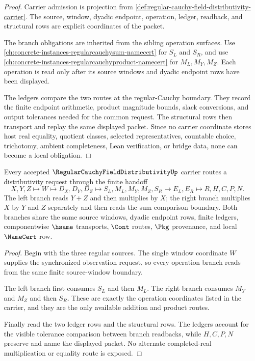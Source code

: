 \begin{proof}
Carrier admission is projection from \autoref{def:regular-cauchy-field-distributivity-carrier}. The source, window, dyadic endpoint, operation, ledger, readback, and structural rows are explicit coordinates of the packet.

The branch obligations are inherited from the sibling operation surfaces. Use \autoref{ch:concrete-instances-regularcauchysum-namecert} for $S_L$ and $S_R$, and use \autoref{ch:concrete-instances-regularcauchyproduct-namecert} for $M_L,M_Y,M_Z$. Each operation is read only after its source windows and dyadic endpoint rows have been displayed.

The ledgers compare the two routes at the regular-Cauchy boundary. They record the finite endpoint arithmetic, product magnitude bounds, slack conversions, and output tolerances needed for the common request. The structural rows then transport and replay the same displayed packet. Since no carrier coordinate stores host real equality, quotient classes, selected representatives, countable choice, trichotomy, ambient completeness, Lean verification, or bridge data, none can become a local obligation.
\end{proof}

\begin{theorem}
\label{thm:regular-cauchy-field-distributivity-window-handoff}
Every accepted $\RegularCauchyFieldDistributivityUp$ carrier routes a distributivity request through the finite handoff
$$
X,Y,Z \longmapsto W \longmapsto D_X,D_Y,D_Z \longmapsto S_L,M_L,M_Y,M_Z,S_R \longmapsto E_L,E_R \longmapsto R,H,C,P,N .
$$
The left branch reads $Y+Z$ and then multiplies by $X$; the right branch multiplies $X$ by $Y$ and $Z$ separately and then reads the sum comparison boundary. Both branches share the same source windows, dyadic endpoint rows, finite ledgers, componentwise $\hsame$ transports, $\Cont$ routes, $\Pkg$ provenance, and local $\NameCert$ row.
\end{theorem}
\begin{proof}
Begin with the three regular sources. The single window coordinate $W$ supplies the synchronized observation request, so every operation branch reads from the same finite source-window boundary.

The left branch first consumes $S_L$ and then $M_L$. The right branch consumes $M_Y$ and $M_Z$ and then $S_R$. These are exactly the operation coordinates listed in the carrier, and they are the only available addition and product routes.

Finally read the two ledger rows and the structural rows. The ledgers account for the visible tolerance comparison between branch readbacks, while $H,C,P,N$ preserve and name the displayed packet. No alternate completed-real multiplication or equality route is exposed.
\end{proof}

